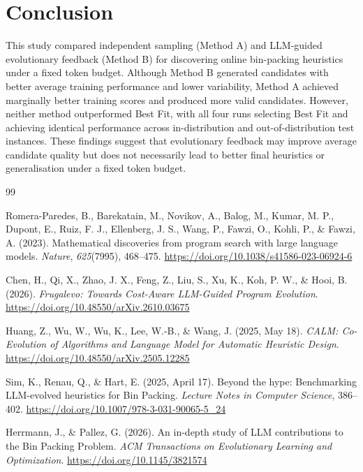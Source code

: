 \documentclass[12pt]{article}
\begin{document}
\section{Conclusion}
This study compared independent sampling (Method A) and LLM-guided evolutionary feedback (Method B) for discovering online bin-packing heuristics under a fixed token budget. Although Method B generated candidates with better average training performance and lower variability, Method A achieved marginally better training scores and produced more valid candidates. However, neither method outperformed Best Fit, with all four runs selecting Best Fit and achieving identical performance across in-distribution and out-of-distribution test instances. These findings suggest that evolutionary feedback may improve average candidate quality but does not necessarily lead to better final heuristics or generalisation under a fixed token budget.

\begin{thebibliography}{99}

Romera-Paredes, B., Barekatain, M., Novikov, A., Balog, M.,
Kumar, M. P., Dupont, E., Ruiz, F. J., Ellenberg, J. S.,
Wang, P., Fawzi, O., Kohli, P., \& Fawzi, A. (2023).
Mathematical discoveries from program search with large language models.
\textit{Nature}, \textit{625}(7995), 468--475.
\url{https://doi.org/10.1038/s41586-023-06924-6}

Chen, H., Qi, X., Zhao, J. X., Feng, Z., Liu, S.,
Xu, K., Koh, P. W., \& Hooi, B. (2026).
\textit{Frugalevo: Towards Cost-Aware LLM-Guided Program Evolution}.
\url{https://doi.org/10.48550/arXiv.2610.03675}

Huang, Z., Wu, W., Wu, K., Lee, W.-B., \& Wang, J. (2025, May 18).
\textit{CALM: Co-Evolution of Algorithms and Language Model
for Automatic Heuristic Design}.
\url{https://doi.org/10.48550/arXiv.2505.12285}

Sim, K., Renau, Q., \& Hart, E. (2025, April 17).
Beyond the hype: Benchmarking LLM-evolved heuristics for Bin Packing.
\textit{Lecture Notes in Computer Science}, 386--402.
\url{https://doi.org/10.1007/978-3-031-90065-5_24}

Herrmann, J., \& Pallez, G. (2026).
An in-depth study of LLM contributions to the Bin Packing Problem.
\textit{ACM Transactions on Evolutionary Learning and Optimization}.
\url{https://doi.org/10.1145/3821574}

\end{thebibliography}
\end{document}
